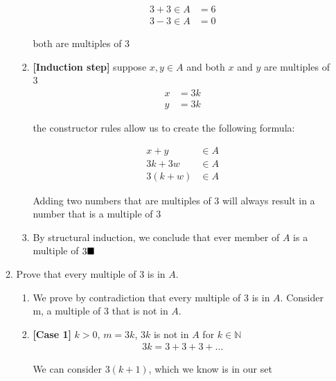 \documentclass{article}
\begin{document}
\begin{itemize}
\begin{enumerate}[label=(\alph*)]
\begin{enumerate}[label=\arabic*.]
\begin{align*}
                    3 + 3 \in A &= 6\\
                    3 - 3 \in A &= 0
                \end{align*}
                \begin{center}
                    both are multiples of 3
                \end{center}
                \item \textbf{[Induction step]} suppose $x, y \in A$ and both $x$ and $y$ are multiples of 3
                \begin{align*}
                    x &= 3k\\
                    y &= 3k
                \end{align*}
                \begin{center}
                    the constructor rules allow us to create the following formula:
                \end{center}
                \begin{align*}
                    x + y &\in A\\
                    3k + 3w &\in A\\
                    3(k+w) &\in A
                \end{align*}
                \begin{center}
                    Adding two numbers that are multiples of 3 will always result in a number that is a multiple of 3
                \end{center}
                \item By structural induction, we conclude that ever member of $A$ is a multiple of $3\hfill\blacksquare$
            \end{enumerate}
            \item Prove that every multiple of 3 is in $A$.
            \begin{enumerate}[label=\arabic*.]
                \item We prove by contradiction that every multiple of 3 is in $A$. Consider m, a multiple of 3 that is not in $A$.
                \item \textbf{[Case 1]} $k > 0$, $m = 3k$, $3k$ is not in $A$ for $k \in \mathbb{N}$
                \begin{align*}
                    3k = 3 + 3 + 3 + ...
                \end{align*}
                \begin{center}
                    We can consider $3(k+1)$, which we know is in our set

\end{center}
\end{enumerate}
\end{enumerate}
\end{itemize}
\end{document}
